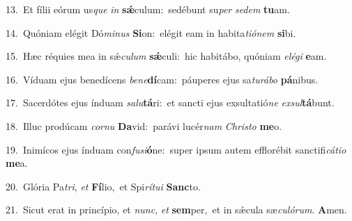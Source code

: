 {\numbfont\textcolor{\numbcolor}{13.}}~Et fílii eórum us\textit{que} \textit{in} \textbf{sǽ}\-culum:~\star sedébunt su\textit{per} \textit{se}\-\textit{dem} \textbf{tu}\-am.\par
{\numbfont\textcolor{\numbcolor}{14.}}~Quóniam elégit Dó\-\textit{mi}\-\textit{nus} \textbf{Si}\-on:~\star elégit eam in habita\-\textit{ti}\-\textit{ó}\textit{nem} \textbf{si}\-bi.\par
{\numbfont\textcolor{\numbcolor}{15.}}~Hæc réquies mea in sǽ\-\textit{cu}\-\textit{lum} \textbf{sǽ}\-culi:~\star hic habitábo, quóniam \textit{e}\-\textit{lé}\textit{gi} \textbf{e}\-am.\par
{\numbfont\textcolor{\numbcolor}{16.}}~Víduam ejus benedícens \textit{be}\-\textit{ne}\textbf{dí}cam:~\star páuperes ejus sa\-\textit{tu}\-\textit{rá}\textit{bo} \textbf{pá}\-nibus.\par
{\numbfont\textcolor{\numbcolor}{17.}}~Sacerdótes ejus índuam \textit{sa}\-\textit{lu}\textbf{tá}ri:~\star et sancti ejus exsultatió\textit{ne} \textit{ex}\-\textit{sul}\textbf{tá}bunt.\par
{\numbfont\textcolor{\numbcolor}{18.}}~Illuc prodúcam \textit{cor}\-\textit{nu} \textbf{Da}\-vid:~\star parávi lucér\textit{nam} \textit{Chris}\-\textit{to} \textbf{me}\-o.\par
{\numbfont\textcolor{\numbcolor}{19.}}~Inimícos ejus índuam con\-\textit{fu}\-\textit{si}\textbf{ó}ne:~\star super ipsum autem efflorébit sanctifi\-\textit{cá}\-\textit{ti}\textit{o} \textbf{me}\-a.\par
{\numbfont\textcolor{\numbcolor}{20.}}~Glória Pa\-\textit{tri}\-, \textit{et} \textbf{Fí}\-lio,~\star et Spi\-\textit{rí}\-\textit{tu}\textit{i} \textbf{Sanc}\-to.\par
{\numbfont\textcolor{\numbcolor}{21.}}~Sicut erat in princípio, et \textit{nunc}\-, \textit{et} \textbf{sem}\-per,~\star et in sǽcula sæ\-\textit{cu}\-\textit{ló}\textit{rum}. \textbf{A}\-men.\par
